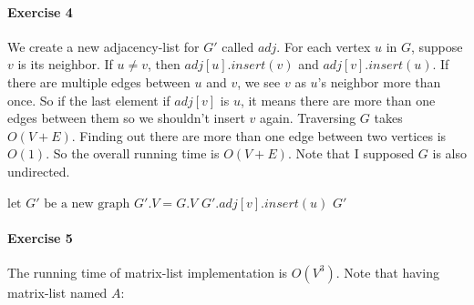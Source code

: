 \documentclass{book}
\begin{document}
	\paragraph{Exercise 4}
	We create a new adjacency-list for $G'$ called $adj$. For each vertex $u$ in $G$, suppose $v$ is its neighbor. If $u \ne v$, then $adj[u].insert(v)$ and $adj[v].insert(u)$. If there are multiple edges between $u$ and $v$, we see $v$ as $u$'s neighbor more than once. So if the last element if $adj[v]$ is $u$, it means there are more than one edges between them so we shouldn't insert $v$ again. Traversing $G$ takes $O(V + E)$. Finding out there are more than one edge between two vertices is $O(1)$. So the overall running time is $O(V + E)$. Note that I supposed $G$ is also undirected.
	\begin{algorithm}[h!]
		\begin{algorithmic}[1]
			\State $\text{let }G' \text{ be a new graph}$
			\State $G'.V = G.V$
						\State $G'.adj[v].insert(u)$		
					\EndIf
				\EndFor
			\EndFor
			\State \Return $G'$
			\EndFunction
		\end{algorithmic}
	\end{algorithm}
	\paragraph{Exercise 5}
	The running time of matrix-list implementation is $O(V^3)$. Note that having matrix-list named $A$:
	
\end{document}
